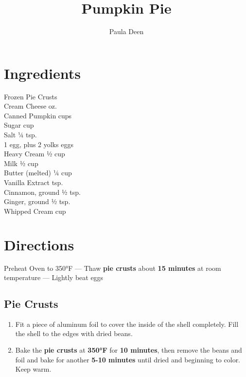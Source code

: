 \documentclass[11pt,letterpaper]{article}
\title{Pumpkin Pie}
\author{Paula Deen}
\date{}
\begin{document}
\maketitle
\thispagestyle{empty}

\section*{Ingredients}
\setlength{\columnsep}{20pt}
\begin{multicols}{2}
\noindent
    Frozen Pie Crusts  \\
    Cream Cheese  oz. \\
    Canned Pumpkin  cups \\
    Sugar  cup \\
	Salt \dotfill ¼ tsp. \\
	1 egg, plus 2 yolks  eggs  \\ 
	\columnbreak
	Heavy Cream \dotfill ½ cup \\
	Milk \dotfill ½ cup \\
	Butter (melted) \dotfill ¼ cup \\
	Vanilla Extract  tsp. \\
	Cinnamon, ground \dotfill ½ tsp. \\
	Ginger, ground \dotfill ½ tsp. \\
	Whipped Cream  cup \\
\end{multicols}

\section*{Directions}

\noindent
Preheat Oven to 350°F ---
Thaw \textbf{pie crusts} about \textbf{15 minutes} at room temperature ---
Lightly beat eggs
\subsection*{Pie Crusts}

\begin{enumerate}
	\item Fit a piece of aluminum foil to cover the inside of the shell completely. Fill the shell to the edges with dried beans.
	\item Bake the \textbf{pie crusts} at \textbf{350°F} for \textbf{10 minutes}, then remove the beans and foil and bake for another \textbf{5-10 minutes} until dried and beginning to color. Keep warm.
\end{enumerate}
\end{document}
